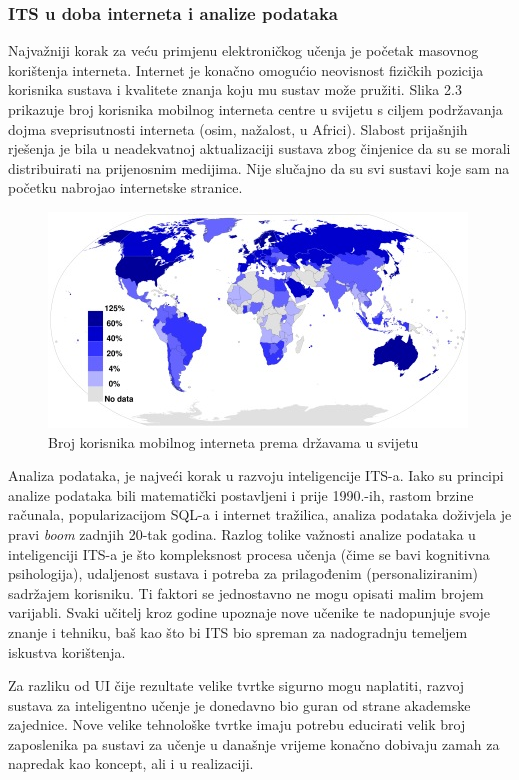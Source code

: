 \documentclass[times, utf8, zavrsni, numeric]{fer}
\begin{document}
\subsubsection{ITS u doba interneta i analize podataka}
Najvažniji korak za veću primjenu elektroničkog učenja je početak masovnog korištenja interneta. Internet je konačno omogućio neovisnost fizičkih pozicija korisnika sustava i kvalitete znanja koju mu sustav može pružiti. Slika 2.3 prikazuje broj korisnika mobilnog interneta centre u svijetu s ciljem podržavanja dojma sveprisutnosti interneta (osim, nažalost, u Africi). Slabost prijašnjih rješenja je bila u neadekvatnoj aktualizaciji sustava zbog činjenice da su se morali distribuirati na prijenosnim medijima. Nije slučajno da su svi sustavi koje sam na početku nabrojao internetske stranice.

\begin{figure}[htb]
	\centering
	\includegraphics[]{img/internet.jpg}
	\caption{Broj korisnika mobilnog interneta prema državama u svijetu\cite{mobilenet}}
	\label{fig:internet}
\end{figure}

\par
Analiza podataka, je najveći korak u razvoju inteligencije ITS-a. Iako su principi analize podataka bili matematički postavljeni i prije 1990.-ih, rastom brzine računala, popularizacijom SQL-a i internet tražilica, analiza podataka doživjela je pravi \textit{boom} zadnjih 20-tak godina. Razlog tolike važnosti analize podataka u inteligenciji ITS-a je što kompleksnost procesa učenja (čime se bavi kognitivna psihologija), udaljenost sustava i potreba za prilagođenim (personaliziranim) sadržajem korisniku. Ti faktori se jednostavno ne mogu opisati malim brojem varijabli. Svaki učitelj kroz godine upoznaje nove učenike te nadopunjuje svoje znanje i tehniku, baš kao što bi ITS bio spreman za nadogradnju temeljem iskustva korištenja.
\par
Za razliku od UI čije rezultate velike tvrtke sigurno mogu naplatiti, razvoj sustava za inteligentno učenje je donedavno bio guran od strane akademske zajednice. Nove velike tehnološke tvrtke imaju potrebu educirati velik broj zaposlenika pa sustavi za učenje u današnje vrijeme konačno dobivaju zamah za napredak kao koncept, ali i u realizaciji.\cite{itspastpresentfuture}
\end{document}
